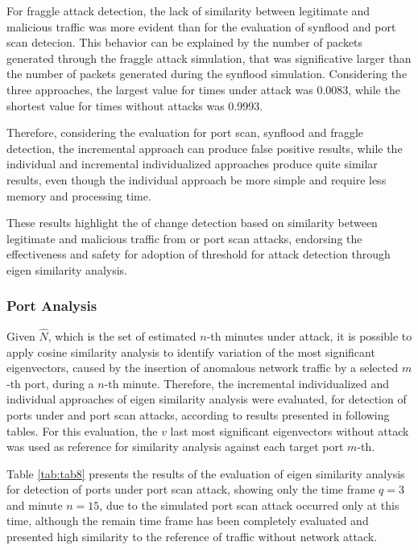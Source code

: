 \documentclass[review]{elsarticle}
\providecommand{\DIFaddtex}[1]{{\protect\color{blue}\uwave{#1}}} %
\providecommand{\DIFaddbegin}{} %
\providecommand{\DIFaddend}{} %
\providecommand{\DIFadd}[1]{\texorpdfstring{\DIFaddtex{#1}}{#1}} %
\begin{document}
For fraggle attack detection, the lack of similarity between legitimate and malicious traffic was more evident than for the evaluation of synflood and port scan detecion. This behavior can be explained by the number of packets generated through the fraggle attack simulation, that was significative larger than the number of packets generated during the synflood simulation. Considering the three approaches, the largest value for times under attack was 0.0083, while the shortest value for times without attacks was 0.9993. 

Therefore, considering the evaluation for port scan, synflood and fraggle detection, the incremental approach can produce false positive results, while the individual and incremental individualized approaches produce quite similar results, even though the individual approach be more simple and require less memory and processing time.

These results highlight the \DIFaddbegin \DIFadd{capability }\DIFaddend of change detection based on similarity between legitimate and malicious traffic from \DIFaddbegin \DIFadd{flood }\DIFaddend or port scan attacks, endorsing the effectiveness and safety for adoption of threshold for attack detection through eigen similarity analysis.

\subsubsection{Port Analysis}
\label{sec:PortAnalysis}

Given $\hat{N}$, which is the set of estimated $n$-th minutes under attack, it is possible to apply cosine similarity analysis to identify variation of the most significant eigenvectors, caused by the insertion of anomalous network traffic by a selected $m$-th port, during a $n$-th minute. Therefore, the incremental individualized and individual approaches of eigen similarity analysis were evaluated, for detection of ports under \DIFaddbegin \DIFadd{flood }\DIFaddend and port scan attacks, according to results presented in following tables. For this evaluation, the $v$ last most significant eigenvectors without attack was used as reference for similarity analysis against each target port $m$-th.

Table \ref{tab:tab8} presents the results of the evaluation of eigen similarity analysis for detection of ports under port scan attack, showing only the time frame $q=3$ and minute $n=15$, due to the simulated port scan attack occurred only at this time, although the remain time frame has been completely evaluated and presented high similarity to the reference of traffic without network attack.
\end{document}
